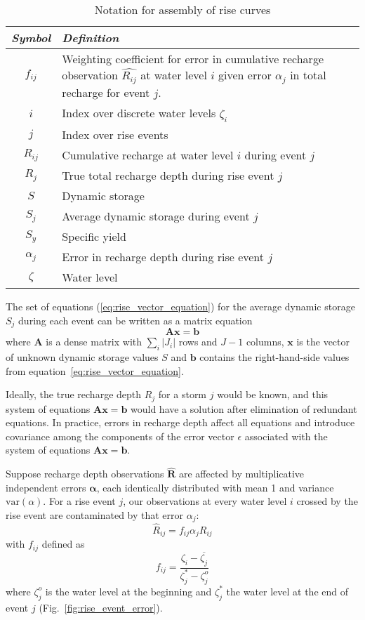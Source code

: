 \documentclass[11pt,a4paper]{article}
\renewcommand{\vec}[1]{\mathbf{#1}}
\begin{document}
\begin{table}[b!]
  \centering
  \begin{tabular}{cp{10.8cm}}
    \emph{Symbol} & \emph{Definition} \\
    \hline
    $f_{ij}$ & Weighting coefficient for error in cumulative recharge
               observation $\widehat{R_{ij}}$ at water level $i$ given
               error $\alpha_j$ in total recharge for event $j$.\\
    $i$ & Index over discrete water levels $\zeta_i$\\
    $j$ & Index over rise events\\
    $R_{ij}$ & Cumulative recharge at water level $i$ during event $j$ \\
    $R_j$ & True total recharge depth during rise event $j$ \\
    $S$ & Dynamic storage \\
    $S_j$ & Average dynamic storage during event $j$ \\
    $S_y$ & Specific yield \\
    $\alpha_j$ & Error in recharge depth during rise event $j$ \\
    $\zeta$ & Water level \\
  \end{tabular}
  \caption{Notation for assembly of rise curves}
  \label{tab:rise_notation}
\end{table}

The set of equations (\ref{eq:rise_vector_equation}) for the average
dynamic storage $S_j$ during each event can be written as a matrix
equation
\begin{equation}
  \vec{A}\vec{x} = \vec{b}
\end{equation}
where $\vec{A}$ is a dense matrix with $\sum_i |J_i|$ rows and $J - 1$
columns, $\vec{x}$ is the vector of unknown dynamic storage values $S$
and $\vec{b}$ contains the right-hand-side values from
equation~\ref{eq:rise_vector_equation}.

Ideally, the true recharge depth $R_j$ for a storm $j$ would be known,
and this system of equations $\vec{A}\vec{x} = \vec{b}$ would have a
solution after elimination of redundant equations.  In practice,
errors in recharge depth affect all equations and introduce covariance
among the components of the error vector $\mathbb{\epsilon}$
associated with the system of equations $\vec{A}\vec{x} = \vec{b}$.

Suppose recharge depth observations $\widehat{\mathbf{R}}$ are
affected by multiplicative independent errors $\bm{\alpha}$, each
identically distributed with mean 1 and variance $\text{var}(\alpha)$.
For a rise event $j$, our observations at every water level $i$
crossed by the rise event are contaminated by that error $\alpha_j$:
\begin{equation}
  \widehat{R}_{ij} = f_{ij}\alpha_j R_{ij}
\end{equation}
with $f_{ij}$ defined as
\begin{equation}
f_{ij} = \frac{\zeta_i - \overline{\zeta_j}}{\zeta_j^* - \zeta^o_j}
\end{equation}
where $\zeta^o_j$ is the water level at the beginning and $\zeta^*_j$
the water level at the end of event $j$
(Fig.~\ref{fig:rise_event_error}).
\end{document}
